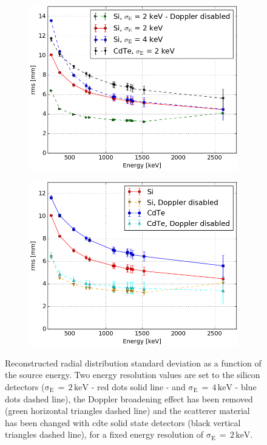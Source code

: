 \begin{figure}
\begin{subfigure}[t]{.5\textwidth}
\centering
\includegraphics[width=\linewidth]{03_GraphicFiles/chapter5_SPECTsimu/SPECT/compton/ENC/rmsVSenergy_ENCstudy_Doppler} 
\caption{}
\label{chap5::subfig::ENCSi}
\end{subfigure}
\begin{subfigure}[t]{.5\textwidth}
\centering
\includegraphics[width=\linewidth]{03_GraphicFiles/chapter5_SPECTsimu/SPECT/compton/ENC/rmsVSenergy_ENCstudy_Doppler_CdTe} 
\caption{}
\label{chap5::subfig::ENCSi}
\end{subfigure}
\caption{Reconstructed radial distribution standard deviation as a function of the source energy. Two energy resolution values are set to the silicon detectors ($\mathrm{\sigma_{E}\,=\,2\,keV}$ - red dots solid line - and $\mathrm{\sigma_{E}\,=\,4\,keV}$ - blue dots dashed line), the Doppler broadening effect has been removed (green horizontal triangles dashed line) and the scatterer material has been changed with \gls{cdte} solid state detectors (black vertical triangles dashed line), for a fixed energy resolution of $\mathrm{\sigma_{E}\,=\,2\,keV}$.}
\label{chap5::fig::ENC_study}
\end{figure}      
     
